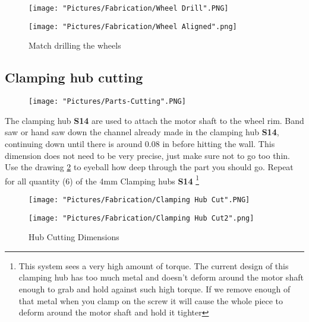 \documentclass[12pt]{article}
\begin{document}
\begin{figure}[H]
  \centering
  \begin{minipage}[b]{0.45\textwidth}
    \texttt{[image: "Pictures/Fabrication/Wheel Drill".PNG]}
  \end{minipage}
  \hfill
  \begin{minipage}[b]{0.45\textwidth}
    \texttt{[image: "Pictures/Fabrication/Wheel Aligned".png]}
  \end{minipage}
  \caption{Match drilling the wheels}
  \label{Wheel drill}
\end{figure}



\subsection{Clamping hub cutting}

\begin{figure}[H]
	\centering
	\texttt{[image: "Pictures/Parts-Cutting".PNG]}
\end{figure}


The clamping hub \textbf{S14} are used to attach the motor shaft to the wheel rim. Band saw or hand saw down the channel already made in the clamping hub \textbf{S14}, continuing down until there is around 0.08 in before hitting the wall. This dimension does not need to be very precise, just make sure not to go too thin. Use the drawing \ref{Clamping hub cut} to eyeball how deep through the part you should go. Repeat for all quantity (6) of the 4mm Clamping hubs \textbf{S14} \footnote{This system sees a very high amount of torque. The current design of this clamping hub has too much metal and doesn't deform around the motor shaft enough to grab and hold against such high torque. If we remove enough of that metal when you clamp on the screw it will cause the whole piece to deform around the motor shaft and hold it tighter}




\begin{figure}[H]
  \centering
  \begin{minipage}[b]{0.45\textwidth}
    \texttt{[image: "Pictures/Fabrication/Clamping Hub Cut".PNG]}
  \end{minipage}
  \hfill
  \begin{minipage}[b]{0.45\textwidth}
    \texttt{[image: "Pictures/Fabrication/Clamping Hub Cut2".png]}
  \end{minipage}
  \caption{Hub Cutting Dimensions}
  \label{Clamping hub cut}
\end{figure}
\end{document}
